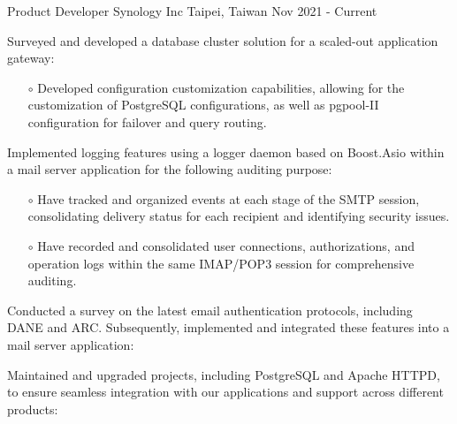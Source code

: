 \begin{cventries}
  \cventry
    {Product Developer} %
    {Synology Inc} %
    {Taipei, Taiwan} %
    {Nov 2021 - Current} %
    {
      \begin{cvitems} %
        \item Surveyed and developed a database cluster solution for a scaled-out application gateway:
        \vspace{0.3em}
            \begin{itemize}
                \item[$\circ$] {Developed configuration customization capabilities, allowing for the customization of PostgreSQL configurations, as well as pgpool-II configuration for failover and query routing.}
            \end{itemize}
        \vspace{0.8em}
        \item {Implemented logging features using a logger daemon based on Boost.Asio within a mail server application for the following auditing purpose:}
            \vspace{0.3em}
            \begin{itemize}
                \item[$\circ$] {Have tracked and organized events at each stage of the SMTP session, consolidating delivery status for each recipient and identifying security issues.}
                \item[$\circ$] {Have recorded and consolidated user connections, authorizations, and operation logs within the same IMAP/POP3 session for comprehensive auditing.}
            \end{itemize}
        \vspace{0.8em}
        \item {Conducted a survey on the latest email authentication protocols, including DANE and ARC. Subsequently, implemented and integrated these features into a mail server application:}
        \vspace{0.8em}
        \item {Maintained and upgraded projects, including PostgreSQL and Apache HTTPD, to ensure seamless integration with our applications and support across different products:}
      \end{cvitems}
    }
\end{cventries}
